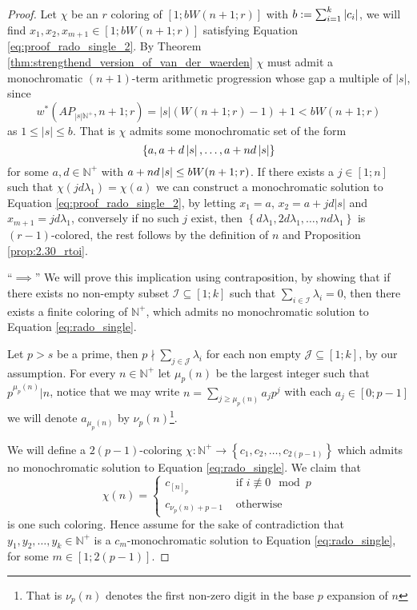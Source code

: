 \begin{proof}
	Let $\chi$ be an $r$ coloring of $[1; bW(n + 1; r)]$ with $b := \sum_{i = 1}^k \left\lvert c_{i}\right\rvert$, we will find $x_1, x_2, x_{m + 1} \in [1; bW(n + 1; r)]$ satisfying Equation \eqref{eq:proof_rado_single_2}. By Theorem \ref{thm:strengthend_version_of_van_der_waerden} $\chi$ must admit a monochromatic $(n + 1)$-term arithmetic progression whose gap a multiple of $|s|$, since
	\begin{equation*}
		w^{*}\left(AP_{|s|\mathbb{N}^{+}}, n + 1; r\right) = |s|(W(n + 1; r) - 1) + 1 < bW(n + 1; r)
	\end{equation*}
	as $1 \leq |s| \leq b$.
	That is $\chi$ admits some monochromatic set of the form
	\begin{equation*}
		\left\{a, a+ d\left\lvert s\right\rvert, \ldots, a + nd \left\lvert s\right\rvert\right\}
	\end{equation*}
	for some $a, d \in \mathbb{N}^{+}$ with $a + nd\left\lvert s\right\rvert \leq bW(n + 1; r)$.
	If there exists a $j \in [1; n]$ such that $\chi(jd\lambda_1) = \chi(a)$ we can construct a monochromatic solution to Equation \eqref{eq:proof_rado_single_2}, by letting $x_1 = a$, $x_2 = a + jd|s|$ and $x_{m + 1} = jd\lambda_{1}$, conversely if no such $j$ exist, then $\left\{d\lambda_1, 2d\lambda_1, \ldots, nd\lambda_1\right\} $ is $(r-1)$-colored, the rest follows by the definition of $n$ and Proposition \ref{prop:2.30_rtoi}.

	``$\implies$'' We will prove this implication using contraposition, by showing that if there exists no non-empty subset $\mathcal{I} \subseteq [1; k]$ such that $\sum_{i \in \mathcal{I}} \lambda_{i} = 0$, then there exists a finite coloring of $\mathbb{N}^{+}$, which admits no monochromatic solution to Equation \eqref{eq:rado_single}.

	Let $p > s$ be a prime, then $p \nmid \sum_{j \in \mathcal{J}} \lambda_{i}$ for each non empty $\mathcal{J} \subseteq [1; k]$, by our assumption. For every $n \in \mathbb{N}^{+}$ let $\mu_p(n)$ be the largest integer such that $p^{\mu_p(n)} \vert n$, notice that we may write $n = \sum_{j \geq \mu_p(n)} a_j p^{j}$ with each $a_j \in [0; p - 1]$ we will denote $a_{\mu_p(n)}$ by $\nu_{p}(n)$\footnote{That is $\nu_{p}(n)$ denotes the first non-zero digit in the base $p$ expansion of $n$}.

	We will define a $2(p - 1)$-coloring $\chi: \mathbb{N}^{+} \to \left\{c_1, c_2, \ldots, c_{2(p-1)}\right\}$ which admits no monochromatic solution to Equation \eqref{eq:rado_single}. We claim that
	\begin{equation*}
		\chi(n) = \begin{cases}
			c_{[n]_{p}}            & \text{ if } i \not \equiv 0 \mod p \\
			c_{\nu_{p}(n) + p - 1} & \text{ otherwise }
		\end{cases}
	\end{equation*}
	is one such coloring. Hence assume for the sake of contradiction that $y_1, y_2, \ldots, y_k \in \mathbb{N}^{+}$ is a $c_m$-monochromatic solution to Equation \eqref{eq:rado_single}, for some $m \in [1; 2(p - 1)]$.


\end{proof}
